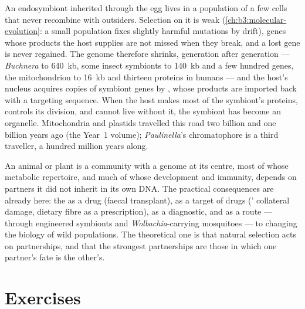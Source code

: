 \begin{proposition}\label{prop:b3:microbiomes:reduction}
An endosymbiont inherited through the egg lives in a population of a
few cells that never recombine with outsiders. Selection on it is weak
(\cref{ch:b3:molecular-evolution}: a small population fixes slightly
harmful mutations by drift), genes whose products the host supplies are
not missed when they break, and a lost gene is never regained. The
genome therefore shrinks, generation after generation --- \emph{Buchnera}
to \qty{640}{kb}, some insect symbionts to \qty{140}{kb} and a few
hundred genes, the mitochondrion to \qty{16}{kb} and thirteen proteins
in humans --- and the host's nucleus acquires copies of symbiont genes
by \emph{}, whose products are imported
back with a targeting sequence. When the host makes most of the
symbiont's proteins, controls its division, and cannot live without it,
the symbiont has become an organelle. Mitochondria and plastids
travelled this road two billion and one billion years ago
(the Year~1 volume); \emph{Paulinella}'s chromatophore is a third
traveller, a hundred million years along.
\end{proposition}

\begin{remark}\label{rem:b3:microbiomes:individual}
An animal or plant is a community with a genome at its centre, most of
whose metabolic repertoire, and much of whose development and
immunity, depends on partners it did not inherit in its own DNA. The
practical consequences are already here: the  as a drug
(faecal transplant), as a target of drugs (' collateral
damage, dietary fibre as a prescription), as a diagnostic, and as a
route --- through engineered symbionts and \emph{Wolbachia}-carrying
mosquitoes --- to changing the biology of wild populations. The
theoretical one is that natural selection acts on partnerships, and
that the strongest partnerships are those in which one partner's fate
is the other's.
\end{remark}

\section{Exercises}

